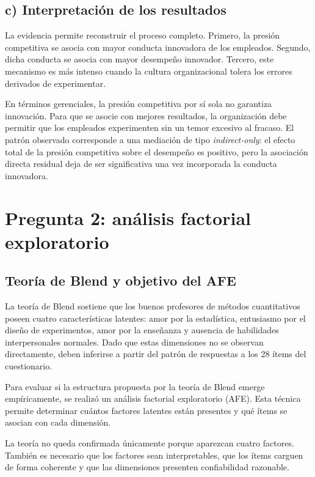 \documentclass[12pt,letterpaper]{article}
\begin{document}
\subsection{c) Interpretación de los resultados}

La evidencia permite reconstruir el proceso completo. Primero, la presión competitiva se asocia con mayor conducta innovadora de los empleados. Segundo, dicha conducta se asocia con mayor desempeño innovador. Tercero, este mecanismo es más intenso cuando la cultura organizacional tolera los errores derivados de experimentar.

En términos gerenciales, la presión competitiva por sí sola no garantiza innovación. Para que se asocie con mejores resultados, la organización debe permitir que los empleados experimenten sin un temor excesivo al fracaso. El patrón observado corresponde a una mediación de tipo \textit{indirect-only}: el efecto total de la presión competitiva sobre el desempeño es positivo, pero la asociación directa residual deja de ser significativa una vez incorporada la conducta innovadora.

\newpage
\section{Pregunta 2: análisis factorial exploratorio}

\subsection{Teoría de Blend y objetivo del AFE}

La teoría de Blend sostiene que los buenos profesores de métodos cuantitativos poseen cuatro características latentes: amor por la estadística, entusiasmo por el diseño de experimentos, amor por la enseñanza y ausencia de habilidades interpersonales normales. Dado que estas dimensiones no se observan directamente, deben inferirse a partir del patrón de respuestas a los 28 ítems del cuestionario.

Para evaluar si la estructura propuesta por la teoría de Blend emerge empíricamente, se realizó un análisis factorial exploratorio (AFE). Esta técnica permite determinar cuántos factores latentes están presentes y qué ítems se asocian con cada dimensión.

La teoría no queda confirmada únicamente porque aparezcan cuatro factores. También es necesario que los factores sean interpretables, que los ítems carguen de forma coherente y que las dimensiones presenten confiabilidad razonable.
\end{document}
